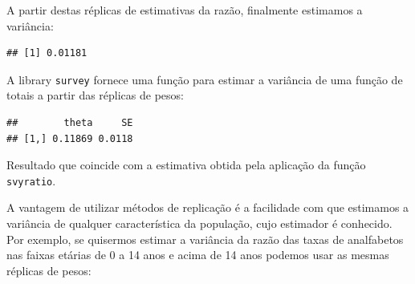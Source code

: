 \documentclass[]{book}
\newenvironment{Shaded}{\begin{snugshade}}{\end{snugshade}}
\newcommand{\KeywordTok}[1]{\textcolor[rgb]{0.13,0.29,0.53}{\textbf{#1}}}
\newcommand{\DecValTok}[1]{\textcolor[rgb]{0.00,0.00,0.81}{#1}}
\newcommand{\StringTok}[1]{\textcolor[rgb]{0.31,0.60,0.02}{#1}}
\newcommand{\ControlFlowTok}[1]{\textcolor[rgb]{0.13,0.29,0.53}{\textbf{#1}}}
\newcommand{\OperatorTok}[1]{\textcolor[rgb]{0.81,0.36,0.00}{\textbf{#1}}}
\newcommand{\NormalTok}[1]{#1}
\theoremstyle{definition}
\theoremstyle{definition}
\theoremstyle{definition}
\theoremstyle{remark}
\begin{document}
A partir destas réplicas de estimativas da razão, finalmente estimamos a
variância:

\begin{Shaded}
\end{Shaded}

\begin{verbatim}
## [1] 0.01181
\end{verbatim}

A library \texttt{survey} \citep{R-survey} fornece uma função para
estimar a variância de uma função de totais a partir das réplicas de
pesos:

\begin{Shaded}
\end{Shaded}

\begin{verbatim}
##        theta     SE
## [1,] 0.11869 0.0118
\end{verbatim}

Resultado que coincide com a estimativa obtida pela aplicação da função
\texttt{svyratio}.

A vantagem de utilizar métodos de replicação é a facilidade com que
estimamos a variância de qualquer característica da população, cujo
estimador é conhecido. Por exemplo, se quisermos estimar a variância da
razão das taxas de analfabetos nas faixas etárias de 0 a 14 anos e acima
de 14 anos podemos usar as mesmas réplicas de pesos:
\end{document}
